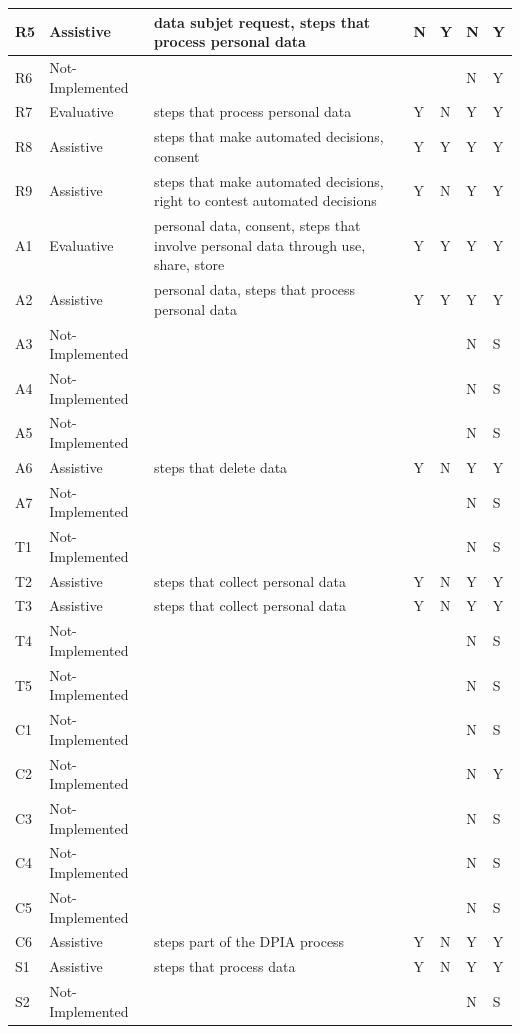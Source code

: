 \begin{table}[htbp]
\begin{tabularx}{\textwidth}{|l|l|X|l|l|l|l|}
R5 & Assistive & data subjet request, steps that process personal data & N & Y & N & Y \\ \hline
R6 & Not-Implemented &  &  &  & N & Y \\ \hline
R7 & Evaluative & steps that process personal data & Y & N & Y & Y \\ \hline
R8 & Assistive & steps that make automated decisions, consent & Y & Y & Y & Y \\ \hline
R9 & Assistive & steps that make automated decisions, right to contest automated decisions & Y & N & Y & Y \\ \hline
A1 & Evaluative & personal data, consent, steps that involve personal data through use, share, store & Y & Y & Y & Y \\ \hline
A2 & Assistive & personal data, steps that process personal data & Y & Y & Y & Y \\ \hline
A3 & Not-Implemented &  &  &  & N & S \\ \hline
A4 & Not-Implemented &  &  &  & N & S \\ \hline
A5 & Not-Implemented &  &  &  & N & S \\ \hline
A6 & Assistive & steps that delete data & Y & N & Y & Y \\ \hline
A7 & Not-Implemented &  &  &  & N & S \\ \hline
T1 & Not-Implemented &  &  &  & N & S \\ \hline
T2 & Assistive & steps that collect personal data & Y & N & Y & Y \\ \hline
T3 & Assistive & steps that collect personal data & Y & N & Y & Y \\ \hline
T4 & Not-Implemented &  &  &  & N & S \\ \hline
T5 & Not-Implemented &  &  &  & N & S \\ \hline
C1 & Not-Implemented &  &  &  & N & S \\ \hline
C2 & Not-Implemented &  &  &  & N & Y \\ \hline
C3 & Not-Implemented &  &  &  & N & S \\ \hline
C4 & Not-Implemented &  &  &  & N & S \\ \hline
C5 & Not-Implemented &  &  &  & N & S \\ \hline
C6 & Assistive & steps part of the DPIA process & Y & N & Y & Y \\ \hline
S1 & Assistive & steps that process data & Y & N & Y & Y \\ \hline
S2 & Not-Implemented &  &  &  & N & S \\ \hline

\end{tabularx}
\end{table}
